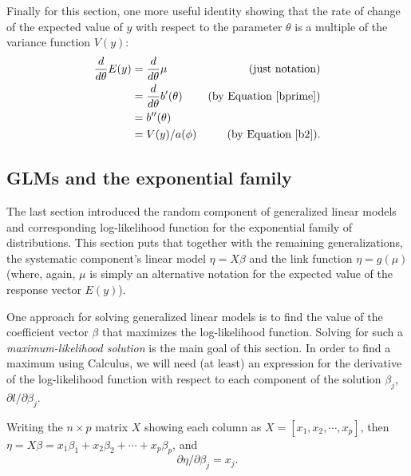 \documentclass[10pt]{article} %
\begin{document}
Finally for this section, one more useful identity showing that the
rate of change of the expected value of $y$ with respect to the parameter $\theta$
is a multiple of the variance function $V(y)$:
\begin{align}
\frac{d}{d\theta}E(y) &= \frac{d}{d\theta}\mu &\mbox{(just notation)}\nonumber\\
&= \frac{d}{d\theta}b'(\theta) &\mbox{(by Equation \ref{bprime})}\nonumber\\
&= b''(\theta)\nonumber\\
&= V(y)/a(\phi)\label{mutheta} &\mbox{(by Equation \ref{b2})}.
\end{align}



\subsection*{GLMs and the exponential family}

The last section introduced the random component of generalized linear models
and corresponding log-likelihood function for the exponential family of
distributions.  This section puts that together with the remaining
generalizations, the systematic component's linear model $\eta = X\beta$ and
the link function $\eta=g(\mu)$ (where, again, $\mu$ is simply an alternative
notation for the expected value of the response vector $E(y)$).

One approach for solving generalized linear models is to find the value of the
coefficient vector $\beta$ that maximizes the log-likelihood function. Solving
for such a \emph{maximum-likelihood solution} is the main goal of this section.
In order to find a maximum using Calculus, we will need (at least) an
expression for the derivative of the log-likelihood function with respect to
each component of the solution $\beta_j$, $\partial{l}/\partial{\beta_j}$.

Writing the $n \times p$ matrix $X$ showing each column as
$X = [x_1, x_2, \cdots, x_p]$, then
$\eta = X\beta = x_1\beta_1 + x_2\beta_2 + \cdots + x_p\beta_p$,
and 
\begin{equation}\label{eta}
\partial\eta/\partial\beta_j = x_j.
\end{equation}
\end{document}
